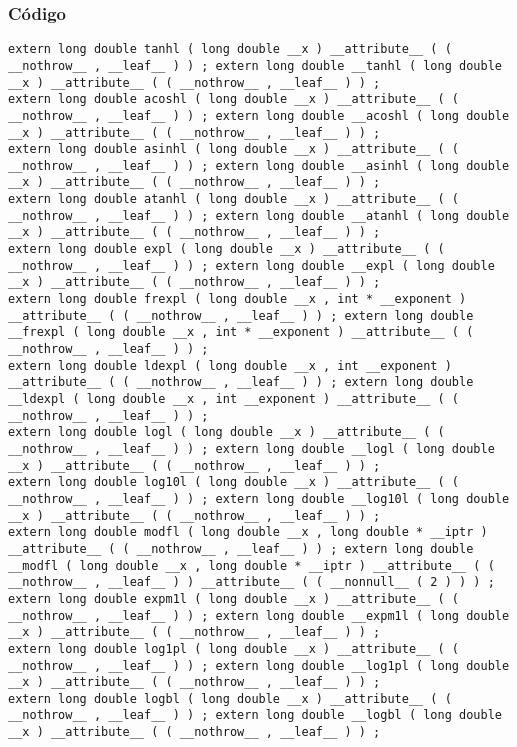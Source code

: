 \documentclass{beamer}
\begin{document}
\begin{frame}[fragile]
\frametitle{C\'odigo}
\begin{verbatim}
extern long double tanhl ( long double __x ) __attribute__ ( ( __nothrow__ , __leaf__ ) ) ; extern long double __tanhl ( long double __x ) __attribute__ ( ( __nothrow__ , __leaf__ ) ) ; 
extern long double acoshl ( long double __x ) __attribute__ ( ( __nothrow__ , __leaf__ ) ) ; extern long double __acoshl ( long double __x ) __attribute__ ( ( __nothrow__ , __leaf__ ) ) ; 
extern long double asinhl ( long double __x ) __attribute__ ( ( __nothrow__ , __leaf__ ) ) ; extern long double __asinhl ( long double __x ) __attribute__ ( ( __nothrow__ , __leaf__ ) ) ; 
extern long double atanhl ( long double __x ) __attribute__ ( ( __nothrow__ , __leaf__ ) ) ; extern long double __atanhl ( long double __x ) __attribute__ ( ( __nothrow__ , __leaf__ ) ) ; 
extern long double expl ( long double __x ) __attribute__ ( ( __nothrow__ , __leaf__ ) ) ; extern long double __expl ( long double __x ) __attribute__ ( ( __nothrow__ , __leaf__ ) ) ; 
extern long double frexpl ( long double __x , int * __exponent ) __attribute__ ( ( __nothrow__ , __leaf__ ) ) ; extern long double __frexpl ( long double __x , int * __exponent ) __attribute__ ( ( __nothrow__ , __leaf__ ) ) ; 
extern long double ldexpl ( long double __x , int __exponent ) __attribute__ ( ( __nothrow__ , __leaf__ ) ) ; extern long double __ldexpl ( long double __x , int __exponent ) __attribute__ ( ( __nothrow__ , __leaf__ ) ) ; 
extern long double logl ( long double __x ) __attribute__ ( ( __nothrow__ , __leaf__ ) ) ; extern long double __logl ( long double __x ) __attribute__ ( ( __nothrow__ , __leaf__ ) ) ; 
extern long double log10l ( long double __x ) __attribute__ ( ( __nothrow__ , __leaf__ ) ) ; extern long double __log10l ( long double __x ) __attribute__ ( ( __nothrow__ , __leaf__ ) ) ; 
extern long double modfl ( long double __x , long double * __iptr ) __attribute__ ( ( __nothrow__ , __leaf__ ) ) ; extern long double __modfl ( long double __x , long double * __iptr ) __attribute__ ( ( __nothrow__ , __leaf__ ) ) __attribute__ ( ( __nonnull__ ( 2 ) ) ) ; 
extern long double expm1l ( long double __x ) __attribute__ ( ( __nothrow__ , __leaf__ ) ) ; extern long double __expm1l ( long double __x ) __attribute__ ( ( __nothrow__ , __leaf__ ) ) ; 
extern long double log1pl ( long double __x ) __attribute__ ( ( __nothrow__ , __leaf__ ) ) ; extern long double __log1pl ( long double __x ) __attribute__ ( ( __nothrow__ , __leaf__ ) ) ; 
extern long double logbl ( long double __x ) __attribute__ ( ( __nothrow__ , __leaf__ ) ) ; extern long double __logbl ( long double __x ) __attribute__ ( ( __nothrow__ , __leaf__ ) ) ; 
\end{verbatim}
\end{frame}
\end{document}
